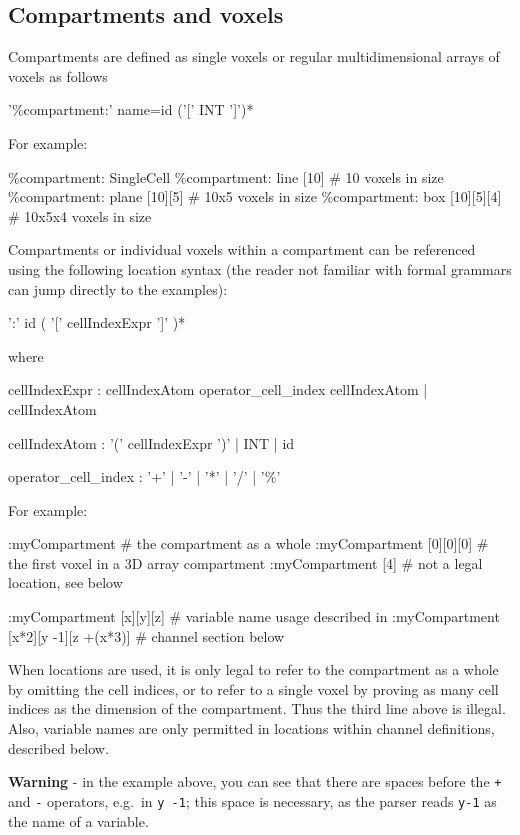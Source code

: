 \documentclass[english]{report}
\begin{document}
\subsection{Compartments and voxels}

Compartments are defined as single voxels or regular multidimensional arrays of voxels as follows
\begin{bnfsource}
'\%compartment:' name=id ('[' INT ']')*
\end{bnfsource}
For example:
\begin{kappasource}
\%compartment: SingleCell 
\%compartment: line  [10]       # 10 voxels in size
\%compartment: plane [10][5]    # 10x5 voxels in size
\%compartment: box   [10][5][4] # 10x5x4 voxels in size
\end{kappasource}

Compartments or individual voxels within a compartment can be referenced using the following location syntax (the reader not familiar with formal grammars can jump directly to the examples):
\begin{bnfsource}
':' id ( '[' cellIndexExpr ']' )*
\end{bnfsource}
where
\begin{bnfsource}
cellIndexExpr :
  cellIndexAtom operator_cell_index cellIndexAtom | cellIndexAtom
  
cellIndexAtom :
  '(' cellIndexExpr ')' | INT | id
  
operator_cell_index :
  '+' | '-' | '*' | '/' | '\%'
\end{bnfsource}
For example:
\begin{kappasource}
:myCompartment                       # the compartment as a whole
:myCompartment [0][0][0]             # the first voxel in a 3D array compartment
:myCompartment [4]                   # not a legal location, see below

:myCompartment [x][y][z]             # variable name usage described in
:myCompartment [x*2][y -1][z +(x*3)] # channel section below
\end{kappasource}

When locations are used, it is only legal to refer to the compartment as a whole by omitting the cell indices, or to refer to a single voxel by proving as many cell indices as the dimension of the compartment. Thus the third line above is illegal. Also, variable names are only permitted in locations within channel definitions, described below.

\textbf{Warning} - in the example above, you can see that there are spaces before the \texttt{+} and \Verb+-+ operators, e.g.\ in \Verb+y -1+; this space is necessary, as the parser reads \Verb+y-1+ as the name of a variable.
\end{document}
